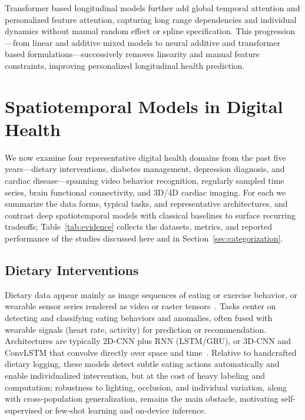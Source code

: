 \documentclass[journal]{IEEEtran}
\begin{document}
Transformer based longitudinal models further add global temporal attention and personalized feature attention, capturing long range dependencies and individual dynamics without manual random effect or spline specification. This progression---from linear and additive mixed models to neural additive and transformer based formulations---successively removes linearity and manual feature constraints, improving personalized longitudinal health prediction.


\section{Spatiotemporal Models in Digital Health}
\label{sec:models}
We now examine four representative digital health domains from the past five years---dietary interventions, diabetes management, depression diagnosis, and cardiac disease---spanning video behavior recognition, regularly sampled time series, brain functional connectivity, and 3D/4D cardiac imaging. For each we summarize the data forms, typical tasks, and representative architectures, and contrast deep spatiotemporal models with classical baselines to surface recurring tradeoffs; Table~\ref{tab:evidence} collects the datasets, metrics, and reported performance of the studies discussed here and in Section~\ref{sec:categorization}.

\subsection{Dietary Interventions}
Dietary data appear mainly as image sequences of eating or exercise behavior, or wearable sensor series rendered as video or raster tensors~\cite{Rouast2020IntakeGesture,Kyritsis2019EatingBehavior}. Tasks center on detecting and classifying eating behaviors and anomalies, often fused with wearable signals (heart rate, activity) for prediction or recommendation. Architectures are typically 2D-CNN plus RNN (LSTM/GRU), or 3D-CNN and ConvLSTM that convolve directly over space and time~\cite{Rouast2020IntakeGesture}. Relative to handcrafted dietary logging, these models detect subtle eating actions automatically and enable individualized intervention, but at the cost of heavy labeling and computation; robustness to lighting, occlusion, and individual variation, along with cross-population generalization, remains the main obstacle, motivating self-supervised or few-shot learning and on-device inference.
\end{document}

